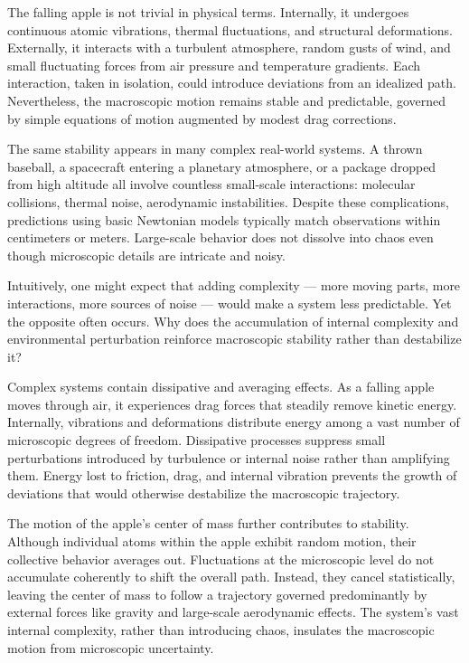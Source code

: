 The falling apple is not trivial in physical terms. Internally, it undergoes continuous atomic vibrations, thermal fluctuations, and structural deformations. Externally, it interacts with a turbulent atmosphere, random gusts of wind, and small fluctuating forces from air pressure and temperature gradients. Each interaction, taken in isolation, could introduce deviations from an idealized path. Nevertheless, the macroscopic motion remains stable and predictable, governed by simple equations of motion augmented by modest drag corrections.

The same stability appears in many complex real-world systems. A thrown baseball, a spacecraft entering a planetary atmosphere, or a package dropped from high altitude all involve countless small-scale interactions: molecular collisions, thermal noise, aerodynamic instabilities. Despite these complications, predictions using basic Newtonian models typically match observations within centimeters or meters. Large-scale behavior does not dissolve into chaos even though microscopic details are intricate and noisy.

Intuitively, one might expect that adding complexity — more moving parts, more interactions, more sources of noise — would make a system less predictable. Yet the opposite often occurs. Why does the accumulation of internal complexity and environmental perturbation reinforce macroscopic stability rather than destabilize it?

Complex systems contain dissipative and averaging effects. As a falling apple moves through air, it experiences drag forces that steadily remove kinetic energy. Internally, vibrations and deformations distribute energy among a vast number of microscopic degrees of freedom. Dissipative processes suppress small perturbations introduced by turbulence or internal noise rather than amplifying them. Energy lost to friction, drag, and internal vibration prevents the growth of deviations that would otherwise destabilize the macroscopic trajectory.

The motion of the apple’s center of mass further contributes to stability. Although individual atoms within the apple exhibit random motion, their collective behavior averages out. Fluctuations at the microscopic level do not accumulate coherently to shift the overall path. Instead, they cancel statistically, leaving the center of mass to follow a trajectory governed predominantly by external forces like gravity and large-scale aerodynamic effects. The system's vast internal complexity, rather than introducing chaos, insulates the macroscopic motion from microscopic uncertainty.

